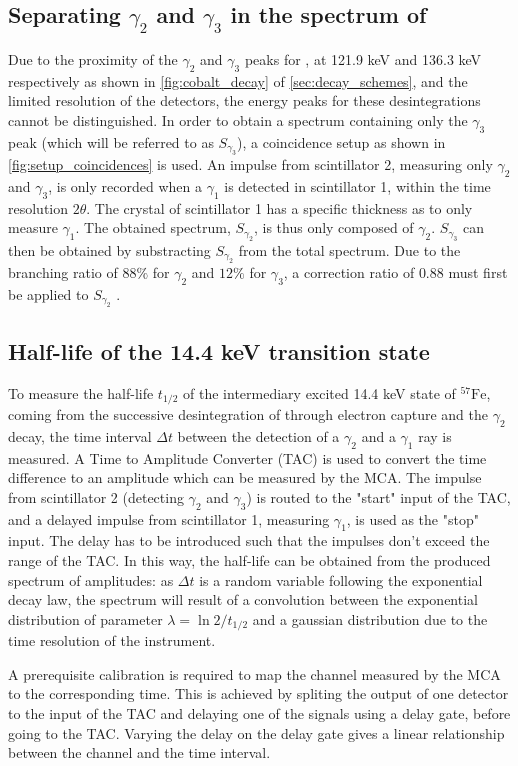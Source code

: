 \subsection{Separating \(\gamma_2\) and \(\gamma_3\) in the spectrum of \cobalt}
\label{sec:separation}

Due to the proximity of the \(\gamma_2\) and \(\gamma_3\) peaks for \cobalt, at 121.9 keV and 136.3 keV respectively as shown in \autoref{fig:cobalt_decay} of \autoref{sec:decay_schemes}, and the limited resolution of the detectors, the energy peaks for these desintegrations cannot be distinguished. In order to obtain a spectrum containing only the \(\gamma_3\) peak (which will be referred to as \(S_{\gamma_3}\)), a coincidence setup as shown in \autoref{fig:setup_coincidences} is used. An impulse from scintillator 2, measuring only \(\gamma_2\) and \(\gamma_3\), is only recorded when a \(\gamma_1\) is detected in scintillator 1, within the time resolution \(2\theta\). The crystal of scintillator 1 has a specific thickness as to only measure \(\gamma_1\). The obtained spectrum, $S_{\gamma_2}$, is thus only composed of \(\gamma_2\). \(S_{\gamma_3}\) can then be obtained by substracting \(S_{\gamma_2}\) from the total spectrum. Due to the branching ratio of  \(88\%\) for \(\gamma_2\) and \(12\%\) for \(\gamma_3\), a correction ratio of \(0.88\) must first be applied to \(S_{\gamma_2}\) \cite{notice_VI}.


\subsection{Half-life of the 14.4 keV transition state}
\label{sec:half_life}

To measure the half-life $t_{1/2}$ of the intermediary excited 14.4 keV state of \(^{57}\textrm{Fe}\), coming from the successive desintegration of \cobalt through electron capture and the \(\gamma_2\) decay, the time interval $\Delta t$ between the detection of a \(\gamma_2\) and a \(\gamma_1\) ray is measured. A Time to Amplitude Converter (TAC) is used to convert the time difference to an amplitude which can be measured by the MCA. The impulse from scintillator 2 (detecting \(\gamma_2\) and \(\gamma_3\)) is routed to the "start" input of the TAC, and a delayed impulse from scintillator 1, measuring \(\gamma_1\), is used as the "stop" input. The delay has to be introduced such that the impulses don't exceed the range of the TAC.
In this way, the half-life can be obtained from the 
produced spectrum of amplitudes: as $\Delta t$ is a 
random variable following the exponential decay law, 
the spectrum will result of a convolution
between the exponential distribution of parameter
$\lambda = \ln{2} / t_{1/2}$ and a gaussian distribution 
due to the time resolution  of the instrument.

A prerequisite calibration is required to map the channel measured by the MCA to the corresponding time. This is achieved by spliting the output of one detector to the input of the TAC and delaying one of the signals using a delay gate, before going to the TAC. Varying the delay on the delay gate gives a linear relationship between the channel and the time interval.
